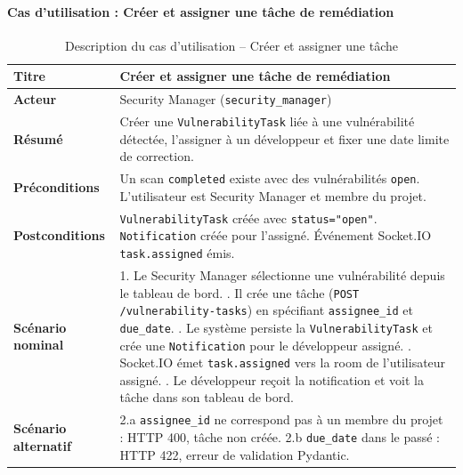 \paragraph{Cas d'utilisation : Créer et assigner une tâche de remédiation}
\begin{table}[H]
\centering
\caption{Description du cas d'utilisation -- Créer et assigner une tâche}
\label{tab:uc-task-create}
\small
\renewcommand{\arraystretch}{1.3}
\begin{tabularx}{\textwidth}{>{\bfseries}p{3.5cm} X}
\hline
Titre & Créer et assigner une tâche de remédiation \\
\hline
Acteur & Security Manager (\texttt{security\_manager}) \\
\hline
Résumé & Créer une \texttt{VulnerabilityTask} liée à une vulnérabilité détectée, l'assigner à un développeur et fixer une date limite de correction. \\
\hline
Préconditions & Un scan \texttt{completed} existe avec des vulnérabilités \texttt{open}. L'utilisateur est Security Manager et membre du projet. \\
\hline
Postconditions & \texttt{VulnerabilityTask} créée avec \texttt{status="open"}. \texttt{Notification} créée pour l'assigné. Événement Socket.IO \texttt{task.assigned} émis. \\
\hline
Scénario nominal &
1. Le Security Manager sélectionne une vulnérabilité depuis le tableau de bord. \newline
2. Il crée une tâche (\texttt{POST /vulnerability-tasks}) en spécifiant \texttt{assignee\_id} et \texttt{due\_date}. \newline
3. Le système persiste la \texttt{VulnerabilityTask} et crée une \texttt{Notification} pour le développeur assigné. \newline
4. Socket.IO émet \texttt{task.assigned} vers la room de l'utilisateur assigné. \newline
5. Le développeur reçoit la notification et voit la tâche dans son tableau de bord. \\
\hline
Scénario alternatif &
2.a \texttt{assignee\_id} ne correspond pas à un membre du projet : HTTP 400, tâche non créée. \newline
2.b \texttt{due\_date} dans le passé : HTTP 422, erreur de validation Pydantic. \\
\hline
\end{tabularx}
\end{table}

